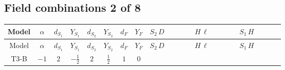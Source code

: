 \documentclass[8pt]{article}
\begin{document}
\begin{landscape}
\subsection*{Field combinations 2 of 8}
\begin{longtable}{@{}cccccccc >{\raggedright\arraybackslash}p{0.21\linewidth} >{\raggedright\arraybackslash}p{0.21\linewidth} >{\raggedright\arraybackslash}p{0.21\linewidth}@{}}
\toprule
Model & $\alpha$ & $d_{S_1}$ & $Y_{S_1}$ & $d_{S_2}$ & $Y_{S_2}$ & $d_F$ & $Y_F$ & $S_2\,D$ & $H\,\ell$ & $S_1\,H$ \\
\midrule
\endfirsthead
\toprule
Model & $\alpha$ & $d_{S_1}$ & $Y_{S_1}$ & $d_{S_2}$ & $Y_{S_2}$ & $d_F$ & $Y_F$ & $S_2\,D$ & $H\,\ell$ & $S_1\,H$ \\
\midrule
\endhead
T3-B & $-1$ & $2$ & $-\frac{1}{2}$ & $2$ & $\frac{1}{2}$ & $1$ & $0$ & \scriptsize\adjustbox{max width=\linewidth}{$\begin{gathered} +D_{\mu _1}\left(S_{2,j_1}\right){}^{\dagger } D_{\mu _1}\left(S_{2,j_1}\right)\end{gathered}$} & \scriptsize\adjustbox{max width=\linewidth}{$\begin{gathered} +\frac{2 \hbar  \overline{y_{1,i_1,r_1}} \overline{y_{2,i_2,r_1}} L_{a_4,i_2}{}^T\, C\, P_L\, L_{a_2,i_1} H_{a_1} H_{a_3} \lambda_5 \epsilon_{a_1,a_2} \epsilon_{a_3,a_4}}{\sqrt{3} \epsilon  M_F} \\ +\frac{2 \hbar  \overline{y_{1,i_1,r_1}} \overline{y_{2,i_2,r_1}} L_{a_4,i_2}{}^T\, C\, P_L\, L_{a_2,i_1} H_{a_1} H_{a_3} \lambda_5 \epsilon_{a_1,a_2} \epsilon_{a_3,a_4}}{\sqrt{3} M_F} \\ +\frac{2 \hbar  \overline{\lambda_5} \overline{L_{a_3,i_1}}\, C\, P_R\, \overline{L_{a_4,i_2}}{}^T y_{1,i_1,r_1} y_{2,i_2,r_1} \epsilon_{a_1,a_3} \epsilon_{a_2,a_4} H_{a_1}{}^{\dagger } H_{a_2}{}^{\dagger }}{\sqrt{3} \epsilon  M_F}\end{gathered}$} & \scriptsize\adjustbox{max width=\linewidth}{$\begin{gathered} +\frac{2 \hbar  \overline{y_{2,i_1,r_1}} H_{a_1} H_{a_2} S_{1,j_1} S_{1,j_2} y_{1,i_1,r_1} \lambda_5 {\mathcal{C}_{LS_2F}}^{*}_{a_1,j_1} {\mathcal{C}_{LS_2F}}^{*}_{a_2,j_2}}{\sqrt{3} \epsilon } \\ +\frac{\hbar  \overline{y_{2,i_1,r_1}} H_{a_1} H_{a_2} S_{1,j_1} S_{1,j_2} y_{1,i_1,r_1} \lambda_5 {\mathcal{C}_{LS_2F}}^{*}_{a_1,j_1} {\mathcal{C}_{LS_2F}}^{*}_{a_2,j_2}}{\sqrt{3}} \\ -\frac{2 \hbar  \overline{y_{1,i_1,r_1}} \overline{Y_{e,i_2,i_3}} H_{a_2} S_{1,j_2} y_{1,i_2,r_1} Y_{e,i_1,i_3} \mathcal{I}_{y_1,a_1,j_2} {\mathcal{C}_{LS_1F}}^{*}_{a_2,j_1} H_{a_1}{}^{\dagger } S_{1,j_1}{}^{\dagger }}{\epsilon }\end{gathered}$} \\

\end{longtable}
\end{landscape}
\end{document}
